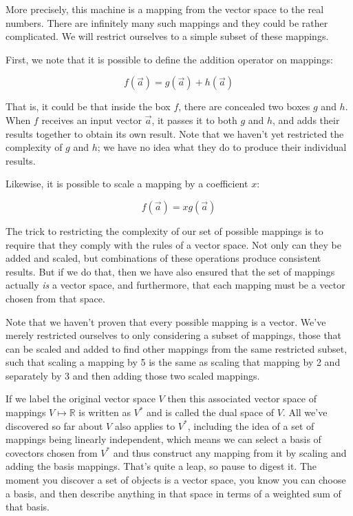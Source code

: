 More precisely, this machine is a mapping from the vector space to the real numbers. There are infinitely many such mappings and they could be rather complicated. We will restrict ourselves to a simple subset of these mappings.

First, we note that it is possible to define the addition operator on mappings:

$$
f(\vec{a}) = g(\vec{a}) + h(\vec{a})
$$

That is, it could be that inside the box $f$, there are concealed two boxes $g$ and $h$. When $f$ receives an input vector $\vec{a}$, it passes it to both $g$ and $h$, and adds their results together to obtain its own result. Note that we haven't yet restricted the complexity of $g$ and $h$; we have no idea what they do to produce their individual results.

Likewise, it is possible to scale a mapping by a coefficient $x$:

$$
f(\vec{a}) = x g(\vec{a})
$$

The trick to restricting the complexity of our set of possible mappings is to require that they comply with the rules of a vector space. Not only can they be added and scaled, but combinations of these operations produce consistent results. But if we do that, then we have also ensured that the set of mappings actually \textit{is} a vector space, and furthermore, that each mapping must be a vector chosen from that space.

Note that we haven't proven that every possible mapping is a vector. We've merely restricted ourselves to only considering a subset of mappings, those that can be scaled and added to find other mappings from the same restricted subset, such that scaling a mapping by 5 is the same as scaling that mapping by 2 and separately by 3 and then adding those two scaled mappings.

If we label the original vector space $V$ then this associated vector space of mappings $V \mapsto \mathbb{R}$ is written as $V^*$ and is called the dual space of $V$. All we've discovered so far about $V$ also applies to $V^*$, including the idea of a set of mappings being linearly independent, which means we can select a basis of covectors chosen from $V^*$ and thus construct any mapping from it by scaling and adding the basis mappings. That's quite a leap, so pause to digest it. The moment you discover a set of objects is a vector space, you know you can choose a basis, and then describe anything in that space in terms of a weighted sum of that basis.

